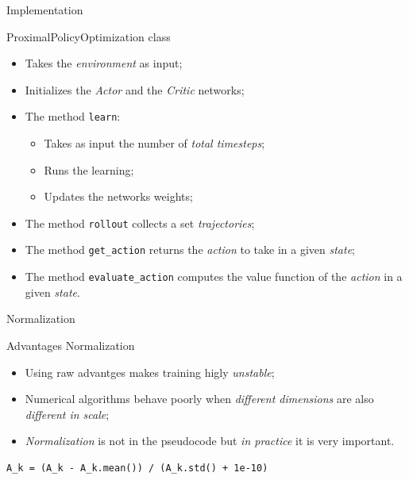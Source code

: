 \documentclass[presentation]{beamer}\mode<presentation>{\usetheme{AMSBolognaFC}}
\begin{document}
\begin{frame}{Implementation}

\begin{block}{ProximalPolicyOptimization class}
	\begin{itemize}
		\item Takes the \emph{environment} as input;
		\item Initializes the \emph{Actor} and the \emph{Critic} networks;
		\item The method \texttt{learn}:
		\begin{itemize}
			\item Takes as input the number of \emph{total timesteps};
			\item Runs the learning;
			\item Updates the networks weights;
		\end{itemize}
		\item The method \texttt{rollout} collects a set \emph{trajectories};
		\item The method \texttt{get\_action} returns the \emph{action} to take in 
			a given \emph{state};
		\item The method \texttt{evaluate\_action} computes the value function of the \emph{action} 
			in a given \emph{state}.
	\end{itemize}
\end{block}


\end{frame}

\begin{frame}[fragile]{Normalization}
\begin{block}{Advantages Normalization}
	\begin{itemize}
		\item Using raw advantges makes training higly \emph{unstable};
		\item Numerical algorithms behave poorly when \emph{different dimensions} 
			are also \emph{different in scale};
		\item \emph{Normalization} is not in the pseudocode but \emph{in practice} it is very important.
	\end{itemize}
\end{block}

\begin{lstlisting}
A_k = (A_k - A_k.mean()) / (A_k.std() + 1e-10)
\end{lstlisting}

\end{frame}
\end{document}
